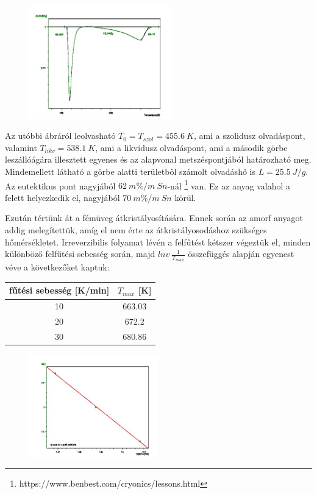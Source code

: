 \documentclass[a4paper,12pt]{article}
\begin{document}
\begin{figure}[H]
\centering
\includegraphics[width=0.55\textwidth]{4outs.jpg}
\end{figure}

\par Az utóbbi ábráról leolvasható $T_{0} = T_{szol} = 455.6 ~K$, ami a szolidusz olvadáspont, valamint $T_{likv} = 538.1 ~K$, ami a likvidusz olvadáspont, ami a második görbe leszállóágára illesztett egyenes és az alapvonal metszéspontjából határozható meg. Mindemellett látható a görbe alatti területből számolt olvadáshő is $L = 25.5 ~J/g$. Az eutektikus pont nagyjából $62 ~m\%/m ~Sn$-nál \footnote{https://www.benbest.com/cryonics/lessons.html} van. Ez az anyag valahol a felett helyezkedik el, nagyjából $70~m\%/m ~Sn$ körül.

\vspace{5mm}

\par Ezután tértünk át a fémüveg átkristályosítására. Ennek során az amorf anyagot addig melegítettük, amíg el nem érte az átkristályosodáshoz szükséges hőmérsékletet. Irreverzibilis folyamat lévén a felfűtést kétszer végeztük el, minden különböző felfűtési sebesség során, majd $ln v ~ \frac{1}{T_{max}}$ összefüggés alapján egyenest véve a következőket kaptuk:

\begin{center}
\begin{tabular}{|c|c|} 
\hline
fűtési sebesség [K/min] & $T_{max}$ [K] \\
\hline
10 & 663.03\\
\hline
20 & 672.2\\
\hline
30 & 680.86\\
\hline
\end{tabular}
\end{center}

\begin{figure}[H]
\centering
\includegraphics[width=0.5\textwidth]{12outs.jpg}
\end{figure}
\end{document}
